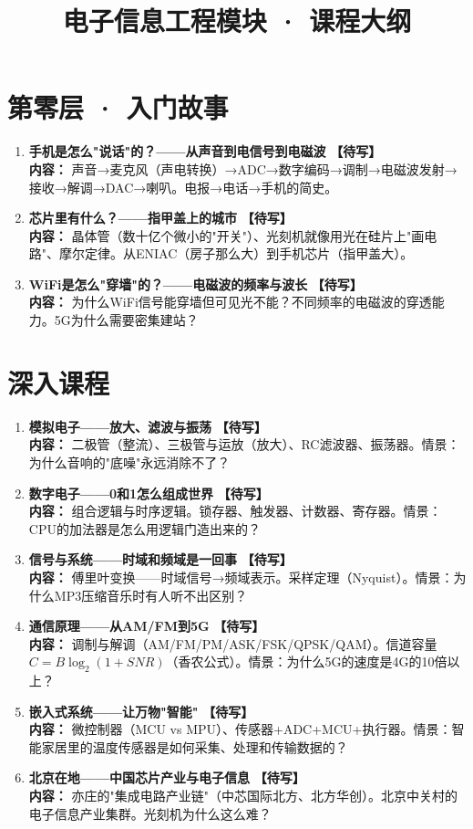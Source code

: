 \documentclass[a4paper,11pt]{ctexart}
\title{\textcolor{blue!70!black}{\Huge\textbf{电子信息工程模块 · 课程大纲}}}
\author{}
\date{}
\newcommand{\draft}{\textcolor{orange!80!black}{\textbf{【待写】}}}
\begin{document}
\maketitle
\thispagestyle{empty}

\section*{第零层 · 入门故事}

\begin{enumerate}
\item[\textbf{第1课}] \textbf{手机是怎么"说话"的？——从声音到电信号到电磁波} \draft \\
\textbf{内容：} 声音→麦克风（声电转换）→ADC→数字编码→调制→电磁波发射→接收→解调→DAC→喇叭。电报→电话→手机的简史。
\item[\textbf{第2课}] \textbf{芯片里有什么？——指甲盖上的城市} \draft \\
\textbf{内容：} 晶体管（数十亿个微小的"开关"）、光刻机就像用光在硅片上"画电路"、摩尔定律。从ENIAC（房子那么大）到手机芯片（指甲盖大）。
\item[\textbf{第3课}] \textbf{WiFi是怎么"穿墙"的？——电磁波的频率与波长} \draft \\
\textbf{内容：} 为什么WiFi信号能穿墙但可见光不能？不同频率的电磁波的穿透能力。5G为什么需要密集建站？
\end{enumerate}

\section*{深入课程}

\begin{enumerate}
\item[\textbf{第1课}] \textbf{模拟电子——放大、滤波与振荡} \draft \\
\textbf{内容：} 二极管（整流）、三极管与运放（放大）、RC滤波器、振荡器。情景：为什么音响的"底噪"永远消除不了？
\item[\textbf{第2课}] \textbf{数字电子——0和1怎么组成世界} \draft \\
\textbf{内容：} 组合逻辑与时序逻辑。锁存器、触发器、计数器、寄存器。情景：CPU的加法器是怎么用逻辑门造出来的？
\item[\textbf{第3课}] \textbf{信号与系统——时域和频域是一回事} \draft \\
\textbf{内容：} 傅里叶变换——时域信号→频域表示。采样定理（Nyquist）。情景：为什么MP3压缩音乐时有人听不出区别？
\item[\textbf{第4课}] \textbf{通信原理——从AM/FM到5G} \draft \\
\textbf{内容：} 调制与解调（AM/FM/PM/ASK/FSK/QPSK/QAM）。信道容量 $C=B\log_2(1+SNR)$（香农公式）。情景：为什么5G的速度是4G的10倍以上？
\item[\textbf{第5课}] \textbf{嵌入式系统——让万物"智能"} \draft \\
\textbf{内容：} 微控制器（MCU vs MPU）、传感器+ADC+MCU+执行器。情景：智能家居里的温度传感器是如何采集、处理和传输数据的？
\item[\textbf{第6课}] \textbf{北京在地——中国芯片产业与电子信息} \draft \\
\textbf{内容：} 亦庄的"集成电路产业链"（中芯国际北方、北方华创）。北京中关村的电子信息产业集群。光刻机为什么这么难？
\end{enumerate}
\end{document}

